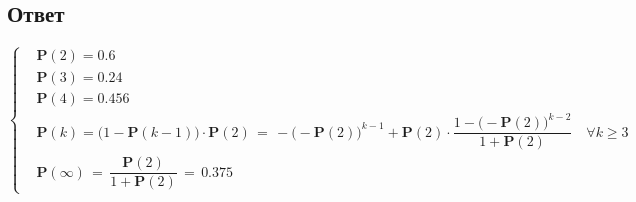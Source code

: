 \documentclass{article}
\begin{document}
\subsection*{Ответ}
\begin{equation*}
\left\{
\begin{aligned}
& \mathbf{P}(2) \! = \! 0.6 \\
& \mathbf{P}(3) \! = \! 0.24 \\
& \mathbf{P}(4) \! = \! 0.456 \\
& \mathbf{P}(k) \! = \! \Big( 1 \! - \! \mathbf{P}(k \! - \! 1) \Big) \! \cdot \! \mathbf{P} (2) \, = \, -{\Big( -\mathbf{P}(2) \Big)}^{k-1} \! + \! \mathbf{P}(2) \! \cdot \! \dfrac{1 \! - \! {\Big( -\mathbf{P}(2) \Big)}^{k-2}}{1 \! + \! \mathbf{P}(2)} \quad \forall k \! \geqslant \! 3 \\
& \mathbf{P} ( \infty ) \, = \, \dfrac{\mathbf{P}(2)}{1 \! + \! \mathbf{P}(2)} \, = \, 0.375
\end{aligned}
\right.
\end{equation*}
\end{document}

